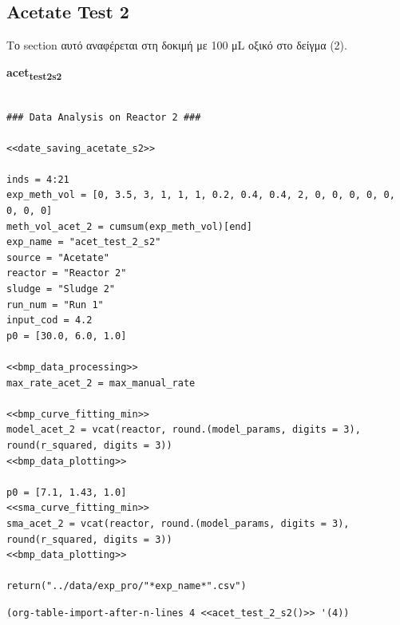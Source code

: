 \documentclass[11pt]{article}
\begin{document}
\subsection{Acetate Test 2}
\label{sec:org38a7c1b}
Το section αυτό αναφέρεται στη δοκιμή με 100 μL οξικό στο δείγμα (2).

\textbf{acet\textsubscript{test}\textsubscript{2}\textsubscript{s2}}
\begin{verbatim}

### Data Analysis on Reactor 2 ###

<<date_saving_acetate_s2>>

inds = 4:21
exp_meth_vol = [0, 3.5, 3, 1, 1, 1, 0.2, 0.4, 0.4, 2, 0, 0, 0, 0, 0, 0, 0, 0]
meth_vol_acet_2 = cumsum(exp_meth_vol)[end]
exp_name = "acet_test_2_s2"
source = "Acetate"
reactor = "Reactor 2"
sludge = "Sludge 2"
run_num = "Run 1"
input_cod = 4.2
p0 = [30.0, 6.0, 1.0]

<<bmp_data_processing>>
max_rate_acet_2 = max_manual_rate

<<bmp_curve_fitting_min>>
model_acet_2 = vcat(reactor, round.(model_params, digits = 3), round(r_squared, digits = 3))
<<bmp_data_plotting>>

p0 = [7.1, 1.43, 1.0]
<<sma_curve_fitting_min>>
sma_acet_2 = vcat(reactor, round.(model_params, digits = 3), round(r_squared, digits = 3))  
<<bmp_data_plotting>>

return("../data/exp_pro/"*exp_name*".csv")
\end{verbatim}

\begin{verbatim}
(org-table-import-after-n-lines 4 <<acet_test_2_s2()>> '(4))
\end{verbatim}
\end{document}
